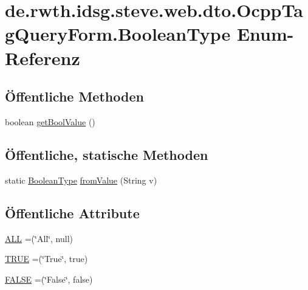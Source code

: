 \hypertarget{enumde_1_1rwth_1_1idsg_1_1steve_1_1web_1_1dto_1_1_ocpp_tag_query_form_1_1_boolean_type}{\section{de.\-rwth.\-idsg.\-steve.\-web.\-dto.\-Ocpp\-Tag\-Query\-Form.\-Boolean\-Type Enum-\/\-Referenz}
\label{enumde_1_1rwth_1_1idsg_1_1steve_1_1web_1_1dto_1_1_ocpp_tag_query_form_1_1_boolean_type}
}
\subsection*{Öffentliche Methoden}
\begin{DoxyCompactItemize}
\item 
boolean \hyperlink{enumde_1_1rwth_1_1idsg_1_1steve_1_1web_1_1dto_1_1_ocpp_tag_query_form_1_1_boolean_type_a91f2fc20c93733d8e2420adc679cc4fa}{get\-Bool\-Value} ()
\end{DoxyCompactItemize}
\subsection*{Öffentliche, statische Methoden}
\begin{DoxyCompactItemize}
\item 
static \hyperlink{enumde_1_1rwth_1_1idsg_1_1steve_1_1web_1_1dto_1_1_ocpp_tag_query_form_1_1_boolean_type}{Boolean\-Type} \hyperlink{enumde_1_1rwth_1_1idsg_1_1steve_1_1web_1_1dto_1_1_ocpp_tag_query_form_1_1_boolean_type_a955c7d858d69f94a9c4a9dc94a62201c}{from\-Value} (String v)
\end{DoxyCompactItemize}
\subsection*{Öffentliche Attribute}
\begin{DoxyCompactItemize}
\item 
\hyperlink{enumde_1_1rwth_1_1idsg_1_1steve_1_1web_1_1dto_1_1_ocpp_tag_query_form_1_1_boolean_type_aaaf30107196a18dde3ebad7bf1a225ac}{A\-L\-L} =(\char`\"{}All\char`\"{}, null)
\item 
\hyperlink{enumde_1_1rwth_1_1idsg_1_1steve_1_1web_1_1dto_1_1_ocpp_tag_query_form_1_1_boolean_type_a1d0cd8f80e6dde69f326cf62cd84fece}{T\-R\-U\-E} =(\char`\"{}True\char`\"{}, true)
\item 
\hyperlink{enumde_1_1rwth_1_1idsg_1_1steve_1_1web_1_1dto_1_1_ocpp_tag_query_form_1_1_boolean_type_a75c90c893de3bf25a7d3c5e831e02497}{F\-A\-L\-S\-E} =(\char`\"{}False\char`\"{}, false)
\end{DoxyCompactItemize}


